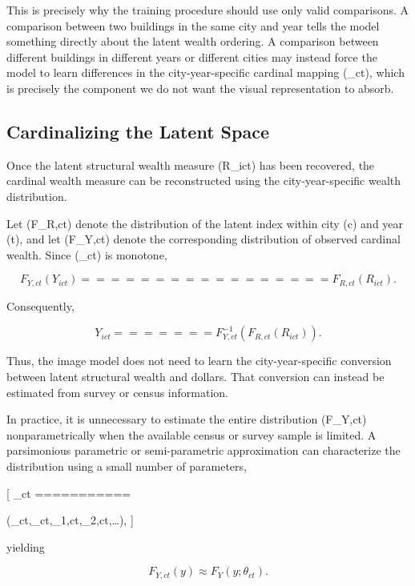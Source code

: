 This is precisely why the training procedure should use only valid comparisons. A comparison between two buildings in the same city and year tells the model something directly about the latent wealth ordering. A comparison between different buildings in different years or different cities may instead force the model to learn differences in the city-year-specific cardinal mapping (\phi_{ct}), which is precisely the component we do not want the visual representation to absorb.

\subsection{Cardinalizing the Latent Space}

Once the latent structural wealth measure (R_{ict}) has been recovered, the cardinal wealth measure can be reconstructed using the city-year-specific wealth distribution.

Let (F_{R,ct}) denote the distribution of the latent index within city (c) and year (t), and let (F_{Y,ct}) denote the corresponding distribution of observed cardinal wealth. Since (\phi_{ct}) is monotone,

\begin{equation}
F_{Y,ct}(Y_{ict})
=================

F_{R,ct}(R_{ict}).
\end{equation}

Consequently,

\begin{equation}
Y_{ict}
=======

F_{Y,ct}^{-1}
\left(
F_{R,ct}(R_{ict})
\right).
\label{eq:quantile_mapping}
\end{equation}

Thus, the image model does not need to learn the city-year-specific conversion between latent structural wealth and dollars. That conversion can instead be estimated from survey or census information.

In practice, it is unnecessary to estimate the entire distribution (F_{Y,ct}) nonparametrically when the available census or survey sample is limited. A parsimonious parametric or semi-parametric approximation can characterize the distribution using a small number of parameters,

[
\theta_{ct}
===========

(\mu_{ct},\sigma_{ct},\gamma_{1,ct},\gamma_{2,ct},\ldots),
]

yielding

\begin{equation}
F_{Y,ct}(y)
\approx
F_Y(y;\theta_{ct}).
\end{equation}

